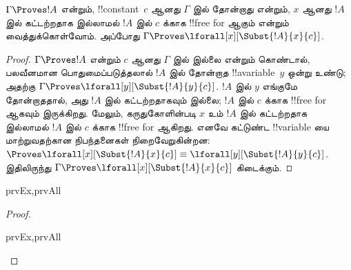 \documentclass[11pt,a4paper,openany]{memoir}
\begin{document}
\begin{thm}[மாறிலிக் குறிகளின் வலிமையான பொதுமைப்படுத்தல்]
$\Gamma \Proves !A$ என்றும், !!{constant}~$c$ ஆனது $\Gamma$ இல்
தோன்றாது என்றும், $x$ ஆனது $!A$ இல் கட்டற்றதாக இல்லாமல் $!A$ இல் $c$
க்காக !!{free for} ஆகும் என்றும் வைத்துக்கொள்வோம். அப்போது
$\Gamma \Proves \lforall[x][\Subst{!A}{x}{c}]$.
\end{thm}

\begin{proof}
$\Gamma \Proves !A$ என்றும் $c$ ஆனது $\Gamma$ இல் இல்லை என்றும்
கொண்டால், பலவீனமான பொதுமைப்படுத்தலால் $!A$ இல் தோன்றாத
!!a{variable}~$y$ ஒன்று உண்டு; அதற்கு $\Gamma \Proves
\lforall[y][\Subst{!A}{y}{c}]$. $!A$ இல் $y$ எங்குமே தோன்றாததால்,
அது $!A$ இல் கட்டற்றதாகவும் இல்லை; $!A$ இல் $c$ க்காக
!!{free for} ஆகவும் இருக்கிறது. மேலும், கருதுகோளின்படி $x$ உம்
$!A$ இல் கட்டற்றதாக இல்லாமல் $!A$ இல் $c$ க்காக !!{free for} ஆகிறது.
எனவே கட்டுண்ட !!{variable} யை மாற்றுவதற்கான நிபந்தனைகள் நிறைவேறுகின்றன:
$\Proves \lforall[x][\Subst{!A}{x}{c}] \equiv
\lforall[y][\Subst{!A}{y}{c}]$. இதிலிருந்து $\Gamma \Proves
\lforall[x][\Subst{!A}{x}{c}]$ கிடைக்கும்.
\end{proof}

\begin{thm}
\begin{tagenumerate}{prvEx,prvAll}
\end{tagenumerate}
\end{thm}

\begin{proof}
\begin{tagenumerate}{prvEx,prvAll}

\end{tagenumerate}
\end{proof}
\end{document}
